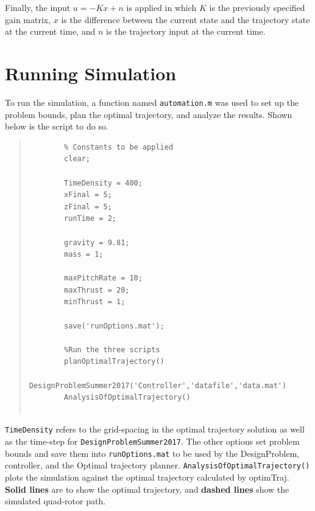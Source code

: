\documentclass[12pt]{article}
\begin{document}
	Finally, the input $u = -Kx + n$ is applied in which $K$ is the previously specified gain matrix, $x$ is the difference between the current state and the trajectory state at the current time, and $n$ is the trajectory input at the current time.
	
	\section{Running Simulation}\label{Running Simulation}
	
	To run the simulation, a function named \lstinline!automation.m! was used to set up the problem bounds, plan the optimal trajectory, and analyze the results. Shown below is the script to do so.
	\begin{quote}
		\begin{lstlisting}
		% Constants to be applied
		clear; 
		
		TimeDensity = 400;
		xFinal = 5;
		zFinal = 5;
		runTime = 2;
		
		gravity = 9.81;
		mass = 1;
		
		maxPitchRate = 10;
		maxThrust = 20;
		minThrust = 1;
		
		save('runOptions.mat');
		
		%Run the three scripts
		planOptimalTrajectory()
		DesignProblemSummer2017('Controller','datafile','data.mat')
		AnalysisOfOptimalTrajectory()
		
		\end{lstlisting}
	\end{quote}
	\lstinline!TimeDensity! refers to the grid-spacing in the optimal trajectory solution as well as the time-step for \lstinline!DesignProblemSummer2017!. The other options set problem bounds and save them into \lstinline!runOptions.mat! to be used by the DesignProblem, controller, and the Optimal trajectory planner. 
	\newline
	\newline
	\lstinline!AnalysisOfOptimalTrajectory()! plots the simulation against the optimal trajectory calculated by optimTraj. \textbf{Solid lines} are to show the optimal trajectory, and \textbf{dashed lines} show the simulated quad-rotor path.
\end{document}
